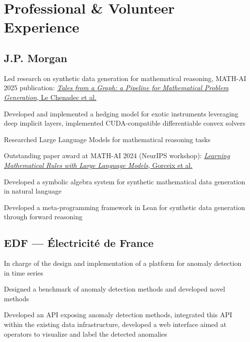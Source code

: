 \section{Professional \& Volunteer Experience}

\subsection{{J.P. Morgan}}
\begin{leftbar}
    \begin{zitemize}
        \item Led research on synthetic data generation for mathematical reasoning, MATH-AI 2025 publication:
        \href{https://openreview.net/forum?id=fqtdnjcHTp}{\textit{Tales from a Graph: a Pipeline for Mathematical Problem Generation}, Le Chenadec et al.}
        \item Developed and implemented a hedging model for exotic instruments leveraging deep implicit layers, implemented CUDA-compatible differentiable convex solvers
    \end{zitemize}
    \begin{zitemize}
        \item Researched Large Language Models for mathematical reasoning tasks
        \item Outstanding paper award at MATH-AI 2024 (NeurIPS workshop):
        \href{https://arxiv.org/abs/2410.16973}{\textit{Learning Mathematical Rules with Large Language Models}, Gorceix et al.}
        \item Developed a symbolic algebra system for synthetic mathematical data generation in natural language
        \item Developed a meta-programming framework in Lean for synthetic data generation through forward reasoning
    \end{zitemize}
\end{leftbar}
\subsection{{EDF --- Électricité de France}}
\begin{leftbar}
    \begin{zitemize}
        \item In charge of the design and implementation of a platform for anomaly detection in time series
        \item Designed a benchmark of anomaly detection methods and developed novel methods
        \item Developed an API exposing anomaly detection methods, integrated this API within the existing data infrastructure, developed a web interface aimed at operators to visualize and label the detected anomalies
    \end{zitemize}
\end{leftbar}

